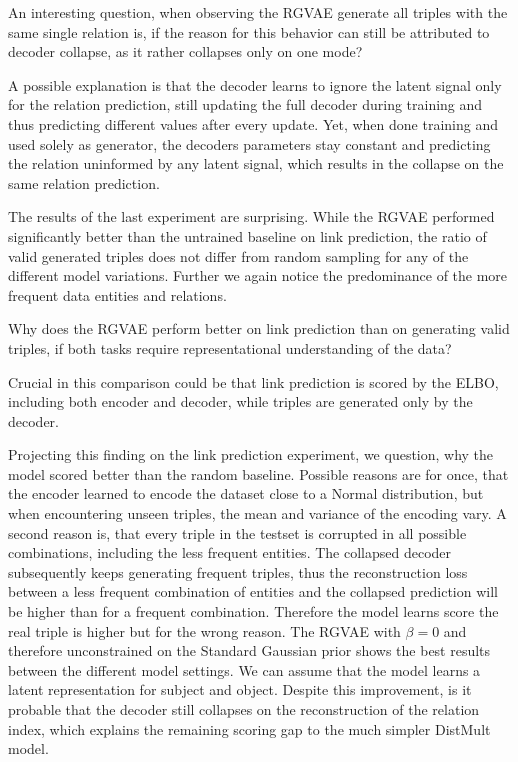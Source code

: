 An interesting question, when observing the RGVAE generate all triples with the same single relation is, if the reason for this behavior can still be attributed to decoder collapse, as it rather collapses only on one mode?

A possible explanation is that the decoder learns to ignore the latent signal only for the relation prediction, still updating the full decoder during training and thus predicting different values after every update. Yet, when done training and used solely as generator, the decoders parameters stay constant and predicting the relation uninformed by any latent signal, which results in the collapse on the same relation prediction.

The results of the last experiment are surprising. While the RGVAE performed significantly better than the untrained baseline on link prediction, the ratio of valid generated triples does not differ from random sampling for any of the different model variations. Further we again notice the predominance of the more frequent data entities and relations.

Why does the RGVAE perform better on link prediction than on generating valid triples, if both tasks require representational understanding of the data?

Crucial in this comparison could be that link prediction is scored by the ELBO, including both encoder and decoder, while triples are generated only by the decoder.


Projecting this finding on the link prediction experiment, we question, why the model scored better than the random baseline. Possible reasons are for once, that the encoder learned to encode the dataset close to a Normal distribution, but when encountering unseen triples, the mean and variance of the encoding vary. A second reason is, that every triple in the testset is corrupted in all possible combinations, including the less frequent entities. The collapsed decoder subsequently keeps generating frequent triples, thus the reconstruction loss between a less frequent combination of entities and the collapsed prediction will be higher than for a frequent combination. Therefore the model learns score the real triple is higher but for the wrong reason. The RGVAE with $\beta = 0$ and therefore unconstrained on the Standard Gaussian prior shows the best results between the different model settings. We can assume that the model learns a latent representation for subject and object. Despite this improvement, is it probable that the decoder still collapses on the reconstruction of the relation index, which explains the remaining scoring gap to the much simpler DistMult model.


